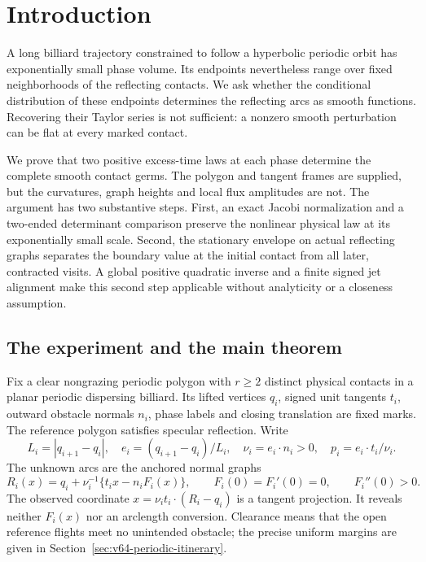 \section{Introduction}
\label{sec:v75-introduction}
\label{sec:v76-introduction}
\label{sec:v70-introduction}

A long billiard trajectory constrained to follow a hyperbolic periodic
orbit has exponentially small phase volume.  Its endpoints nevertheless
range over fixed neighborhoods of the reflecting contacts.  We ask
whether the conditional distribution of these endpoints determines the
reflecting arcs as smooth functions.  Recovering their Taylor series is
not sufficient: a nonzero smooth perturbation can be flat at every
marked contact.

We prove that two positive excess-time laws at each phase determine the
complete smooth contact germs.  The polygon and tangent frames are
supplied, but the curvatures, graph heights and local flux amplitudes are
not.  The argument has two substantive steps.  First, an exact Jacobi
normalization and a two-ended determinant comparison preserve the
nonlinear physical law at its exponentially small scale.  Second, the
stationary envelope on actual reflecting graphs separates the boundary
value at the initial contact from all later, contracted visits.  A global
positive quadratic inverse and a finite signed jet alignment make this
second step applicable without analyticity or a closeness assumption.

\subsection{The experiment and the main theorem}

Fix a clear nongrazing periodic polygon with $r\ge2$ distinct physical
contacts in a planar periodic dispersing billiard.  Its lifted vertices
$q_i$, signed unit tangents $t_i$, outward obstacle normals $n_i$, phase
labels and closing translation are fixed marks.  The reference polygon
satisfies specular reflection.  Write
\[
 L_i=|q_{i+1}-q_i|,\quad e_i=(q_{i+1}-q_i)/L_i,\quad
 \nu_i=e_i\cdot n_i>0,\quad p_i=e_i\cdot t_i/\nu_i.
\]
The unknown arcs are the anchored normal graphs
\begin{equation}\label{eq:v75-graphs}
 R_i(x)=q_i+\nu_i^{-1}\{t_i x-n_iF_i(x)\},\qquad
 F_i(0)=F_i'(0)=0,\qquad F_i''(0)>0.
\end{equation}
The observed coordinate $x=\nu_i t_i\cdot(R_i-q_i)$ is a tangent
projection.  It reveals neither $F_i(x)$ nor an arclength conversion.
Clearance means that the open reference flights meet no unintended
obstacle; the precise uniform margins are given in
Section~\ref{sec:v64-periodic-itinerary}.

